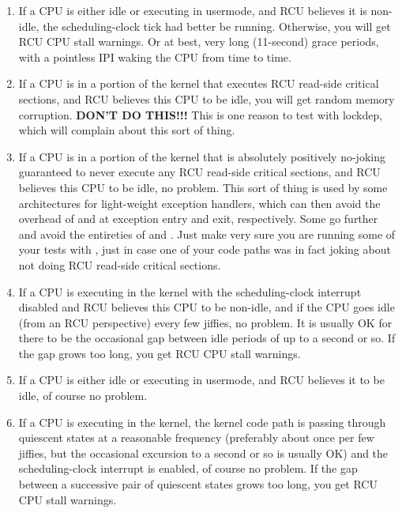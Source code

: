 \begin{enumerate}
\item If a CPU is either idle or executing in usermode, and RCU believes it
   is non-idle, the scheduling-clock tick had better be running.
   Otherwise, you will get RCU CPU stall warnings.
   Or at best, very long
   (11-second) grace periods, with a pointless IPI waking the CPU from
   time to time.
\item If a CPU is in a portion of the kernel that executes RCU read-side
   critical sections, and RCU believes this CPU to be idle, you will get
   random memory corruption.
   \textbf{DON'T DO THIS!!!}
   This is one reason to test with lockdep, which will complain about
   this sort of thing.
\item If a CPU is in a portion of the kernel that is absolutely positively
   no-joking guaranteed to never execute any RCU read-side critical
   sections, and RCU believes this CPU to be idle, no problem.
   This
   sort of thing is used by some architectures for light-weight
   exception handlers, which can then avoid the overhead of
    and  at exception entry and
   exit, respectively.
   Some go further and avoid the entireties of
    and .
   Just make very sure you are running some of your tests with
   , just in case one of your code paths was in
   fact joking about not doing RCU read-side critical sections.
\item If a CPU is executing in the kernel with the scheduling-clock
   interrupt disabled and RCU believes this CPU to be non-idle, and if
   the CPU goes idle (from an RCU perspective) every few jiffies, no
   problem.
   It is usually OK for there to be the occasional gap between
   idle periods of up to a second or so.
   If the gap grows too long, you get RCU CPU stall warnings.
\item If a CPU is either idle or executing in usermode, and RCU believes it
   to be idle, of course no problem.
\item If a CPU is executing in the kernel, the kernel code path is passing
   through quiescent states at a reasonable frequency (preferably about
   once per few jiffies, but the occasional excursion to a second or so
   is usually OK) and the scheduling-clock interrupt is enabled, of
   course no problem.
   If the gap between a successive pair of quiescent states grows too
   long, you get RCU CPU stall warnings.
\end{enumerate}

